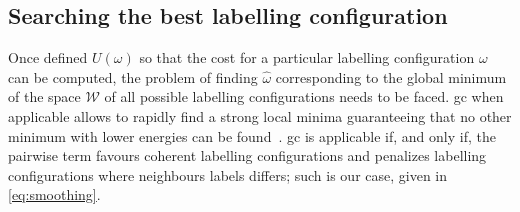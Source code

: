 \subsection{Searching the best labelling configuration} \label{sec:method:min}
Once defined $U(\omega)$ so that the cost for a particular labelling configuration $\omega$ can be computed, the problem of finding $\hat{\omega}$ corresponding to the global minimum of the space $\mathcal{W}$ of all possible labelling configurations needs to be faced. 
%
%
%
\ac{gc} when applicable allows to rapidly find a strong local minima guaranteeing that no other minimum with lower energies can be found~\cite{delong2012fast}. 
\ac{gc} is applicable if, and only if, the pairwise term favours coherent labelling configurations and penalizes labelling configurations where neighbours labels differs; 
such is our case, given in \cref{eq:smoothing}.


